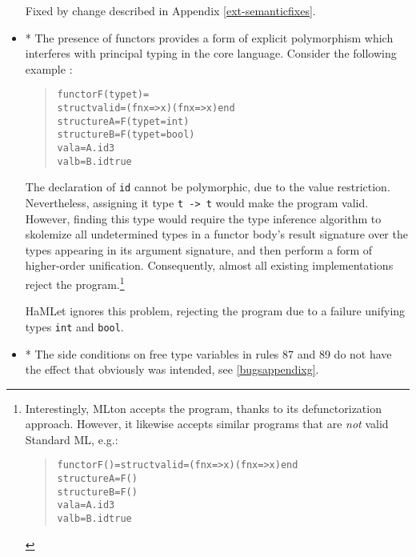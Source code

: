 \documentclass[twoside,titlepage]{article}
\newcommand{\void}[1]{}
\begin{document}
\begin{appendix}
\begin{itemize}
Fixed by change described in Appendix \ref{ext-semanticfixes}.

\item * The presence of functors provides a form of explicit polymorphism which interferes with principal typing in the core language. Consider the following example \cite{principalmodules}:

\begin{quote}
\begin{alltt}
functor F(type t) =
    struct val id = (fn x => x) (fn x => x) end
structure A = F(type t = int)
structure B = F(type t = bool)
val a = A.id 3
val b = B.id true
\end{alltt}
\end{quote}

The declaration of {\tt id} cannot be polymorphic, due to the value restriction. Nevertheless, assigning it type {\tt t -> t} would make the program valid. However,\void{ as Dreyer at al.\ note \cite{typeclasses},} finding this type would require the type inference algorithm to skolemize all undetermined types in a functor body's result signature over the types appearing in its argument signature, and then perform a form of higher-order unification. Consequently, almost all existing implementations reject the program.\footnote{Interestingly, MLton \cite{mlton} accepts the program, thanks to its defunctorization approach. However, it likewise accepts similar programs that are {\it not} valid Standard ML, e.g.:
\begin{quote}
\begin{alltt}
functor F() = struct val id = (fn x => x) (fn x => x) end\\
structure A = F()\\
structure B = F()\\
val a = A.id 3\\
val b = B.id true
\end{alltt}
\end{quote}
}


HaMLet ignores this problem, rejecting the program due to a failure unifying types {\tt int} and {\tt bool}.

\item * The side conditions on free type variables in rules 87 and 89 do not have the effect that obviously was intended, see \ref{bugsappendixg}.


\end{itemize}
\end{appendix}
\end{document}
